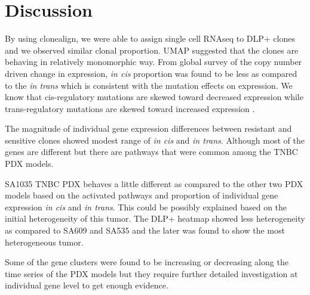 
\section{Discussion}

By using clonealign, we were able to assign single cell RNAseq to  DLP+ clones and we observed similar clonal proportion. UMAP suggested that the clones are behaving in relatively monomorphic way. From global survey of the copy number driven change in expression, \textit{in cis} proportion was found to be less as compared to the \textit{in trans} which is consistent with the mutation effects on expression. We know that cis-regulatory mutations are skewed toward decreased expression while trans-regulatory mutations are skewed toward increased expression \cite{metzger2016contrasting}.

The magnitude of individual gene expression differences between resistant and sensitive clones showed modest range of \textit{in cis} and \textit{in trans}. Although most of the genes are different but there are pathways that were common among the TNBC PDX models. 

SA1035 TNBC PDX behaves a little different as compared to the other two PDX models based on the activated pathways and proportion of individual gene expression \textit{in cis} and \textit{in trans}. This could be possibly explained based on the initial heterogeneity of this tumor. The DLP+ heatmap showed less heterogeneity as compared to SA609 and SA535 and the later was found to show the most heterogeneous tumor.

Some of the gene clusters were found to be increasing or decreasing along the time series of the PDX models but they require further detailed investigation at individual gene level to get enough evidence.









